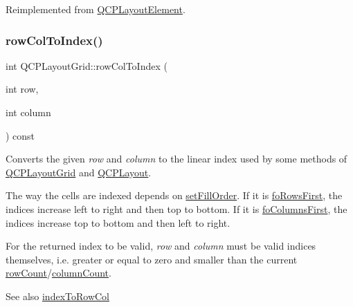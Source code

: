 Reimplemented from \hyperlink{class_q_c_p_layout_element_ab3fdb5c9a5189bb2dac10d4d25329cd8}{Q\+C\+P\+Layout\+Element}.

\mbox{\label{class_q_c_p_layout_grid_a682ba76f130810ffd294032a1bfbcfcb}} 
\subsubsection{\texorpdfstring{row\+Col\+To\+Index()}{rowColToIndex()}}
{\footnotesize\ttfamily int Q\+C\+P\+Layout\+Grid\+::row\+Col\+To\+Index (\begin{DoxyParamCaption}\item[{int}]{row,  }\item[{int}]{column }\end{DoxyParamCaption}) const}

Converts the given {\itshape row} and {\itshape column} to the linear index used by some methods of \hyperlink{class_q_c_p_layout_grid}{Q\+C\+P\+Layout\+Grid} and \hyperlink{class_q_c_p_layout}{Q\+C\+P\+Layout}.

The way the cells are indexed depends on \hyperlink{class_q_c_p_layout_grid_affc2f3cfd22f28698c5b29b960d2a391}{set\+Fill\+Order}. If it is \hyperlink{class_q_c_p_layout_grid_a7d49ee08773de6b2fd246edfed353ccaa0202730954e26c474cc820164aedce3e}{fo\+Rows\+First}, the indices increase left to right and then top to bottom. If it is \hyperlink{class_q_c_p_layout_grid_a7d49ee08773de6b2fd246edfed353ccaac4cb4b796ec4822d5894b47b51627fb3}{fo\+Columns\+First}, the indices increase top to bottom and then left to right.

For the returned index to be valid, {\itshape row} and {\itshape column} must be valid indices themselves, i.\+e. greater or equal to zero and smaller than the current \hyperlink{class_q_c_p_layout_grid_a19c66fd76cbce58a8e94f33797e0c0aa}{row\+Count}/\hyperlink{class_q_c_p_layout_grid_a1a2962cbf45011405b64b913afa8e7a2}{column\+Count}.

\begin{DoxySeeAlso}{See also}
\hyperlink{class_q_c_p_layout_grid_a577223db920e2acb34bc1091080c76d1}{index\+To\+Row\+Col} 
\end{DoxySeeAlso}
\mbox{\label{class_q_c_p_layout_grid_a19c66fd76cbce58a8e94f33797e0c0aa}} 
